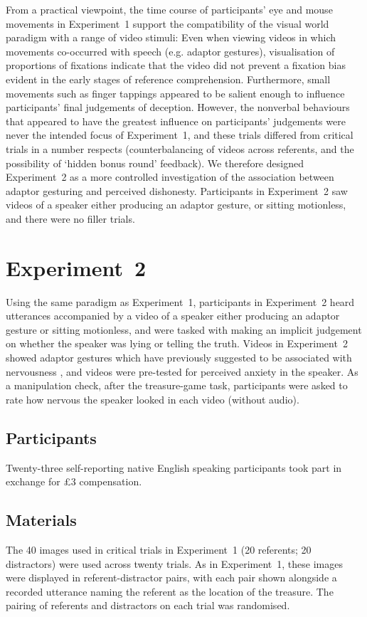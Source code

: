 \documentclass[a4paper,man,natbib]{apa6}
\begin{document}
From a practical viewpoint, the time course of participants' eye  and mouse movements in Experiment~1 support the compatibility of the visual world paradigm with a range of video stimuli: Even when viewing videos in which movements co-occurred with speech (e.g. adaptor gestures), visualisation of proportions of fixations indicate that the video did not prevent a fixation bias evident in the early stages of reference comprehension.
Furthermore, small movements such as finger tappings appeared to be salient enough to influence participants' final judgements of deception.
However, the nonverbal behaviours that appeared to  have the greatest influence on participants' judgements were never the intended focus of Experiment~1, and these trials differed from critical trials in a number respects (counterbalancing of videos across referents, and the possibility of `hidden bonus round' feedback).
We therefore designed Experiment~2 as a more controlled investigation of the association between adaptor gesturing and perceived dishonesty.
Participants in Experiment~2 saw videos of a speaker either producing an adaptor gesture, or sitting motionless, and there were no filler trials.

\section{Experiment~2}
Using the same paradigm as Experiment~1, participants in Experiment~2 heard utterances accompanied by a video of a speaker either producing an adaptor gesture or sitting motionless, and were tasked with making an implicit judgement on whether the speaker was lying or telling the truth.
Videos in Experiment~2 showed adaptor gestures which have previously suggested to be associated with nervousness \citep[See][]{Gregersen2005}, and videos were pre-tested for perceived anxiety in the speaker.
As a manipulation check, after the treasure-game task, participants were asked to rate how nervous the speaker looked in each video (without audio).

\subsection{Participants}
Twenty-three self-reporting native English speaking participants took part in exchange for \pounds{}3 compensation.


\subsection{Materials}
The 40 images used in critical trials in Experiment~1 (20 referents; 20 distractors) were used across twenty trials.
As in Experiment~1, these images were displayed in referent-distractor pairs, with each pair shown alongside a recorded utterance naming the referent as the location of the treasure.
The pairing of referents and distractors on each trial was randomised.
\end{document}
